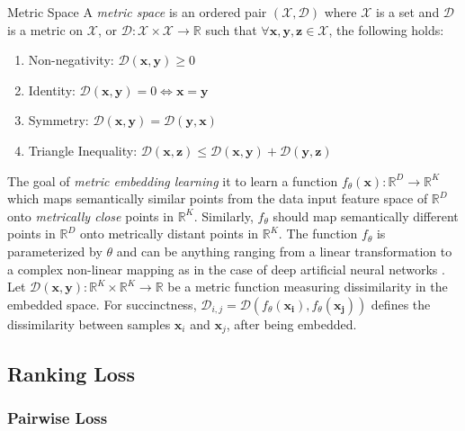  \theoremstyle{definition}
 \begin{definition}{Metric Space}
 A \textit{metric space} is an ordered pair $(\mathcal{X},\mathcal{D})$ where $\mathcal{X}$ is a set and $\mathcal{D}$ is a metric on $\mathcal{X}$, or $\mathcal{D}:\mathcal{X} \times \mathcal{X} \rightarrow \mathbb{R}$ such that $\forall \bm{x},\bm{y},\bm{z}\in\mathcal{X}$, the following holds:

 \end{definition}
 	\begin{enumerate}
	\item Non-negativity: $\mathcal{D}(\bm{x},\bm{y}) \geq 0$
	\item Identity: $\mathcal{D}(\bm{x},\bm{y}) = 0 \iff \bm{x} = \bm{y} $
	\item Symmetry: $\mathcal{D}(\bm{x},\bm{y}) = \mathcal{D}(\bm{y},\bm{x})$
	\item Triangle Inequality:  $\mathcal{D}(\bm{x},\bm{z}) \leq \mathcal{D}(\bm{x},\bm{y}) + \mathcal{D}(\bm{y},\bm{z})$
	\end{enumerate}

The goal of \textit{metric embedding learning} it to learn a function $f_{\theta}(\bm{x}):\mathbb{R}^{D} \rightarrow \mathbb{R}^{K}$ which maps semantically similar points from the data input feature space of $\mathbb{R}^{D}$ onto \textit{metrically close} points in $\mathbb{R}^{K}$.  Similarly, $f_{\theta}$ should map semantically different points in $\mathbb{R}^{D}$ onto metrically distant points in $\mathbb{R}^{K}$.  The function $f_{\theta}$ is parameterized by $\theta$ and can be anything ranging from a linear transformation to a complex non-linear mapping as in the case of deep artificial neural networks \citep{Hermans2017DefenseTripletLoss}.  Let $\mathcal{D}(\bm{x},\bm{y}): \mathbb{R}^{K} \times \mathbb{R}^{K} \rightarrow \mathbb{R}$ be a metric function measuring dissimilarity in the embedded space.  For succinctness, $\mathcal{D}_{i,j} = \mathcal{D}(f_{\theta}(\bm{x_{i}}),f_{\theta}(\bm{x_{j}}))$
defines the dissimilarity between samples $\bm{x}_{i}$ and $\bm{x}_{j}$, after being embedded.

	\subsection{Ranking Loss}
	
	\subsubsection{Pairwise Loss}
	
